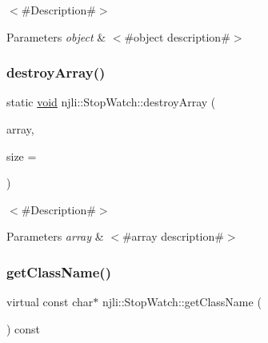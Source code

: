 $<$\#\+Description\#$>$


\begin{DoxyParams}{Parameters}
{\em object} & $<$\#object description\#$>$ \\
\hline
\end{DoxyParams}
\mbox{\label{classnjli_1_1_stop_watch_a606c409e3940aea9d90bca5037eb2227}} 
\subsubsection{\texorpdfstring{destroy\+Array()}{destroyArray()}}
{\footnotesize\ttfamily static \mbox{\hyperlink{_thread_8h_af1e856da2e658414cb2456cb6f7ebc66}{void}} njli\+::\+Stop\+Watch\+::destroy\+Array (\begin{DoxyParamCaption}\item[{\mbox{\hyperlink{classnjli_1_1_stop_watch}{Stop\+Watch}} $\ast$$\ast$}]{array,  }\item[{const \mbox{\hyperlink{_util_8h_a10e94b422ef0c20dcdec20d31a1f5049}{u32}}}]{size = {} }\end{DoxyParamCaption})\hspace{0.3cm}{\ttfamily [static]}}

$<$\#\+Description\#$>$


\begin{DoxyParams}{Parameters}
{\em array} & $<$\#array description\#$>$ \\
\hline
\end{DoxyParams}
\mbox{\label{classnjli_1_1_stop_watch_a70283751febb463682cf4126c970aaa5}} 
\subsubsection{\texorpdfstring{get\+Class\+Name()}{getClassName()}}
{\footnotesize\ttfamily virtual const char$\ast$ njli\+::\+Stop\+Watch\+::get\+Class\+Name (\begin{DoxyParamCaption}{ }\end{DoxyParamCaption}) const\hspace{0.3cm}{\ttfamily [virtual]}}

